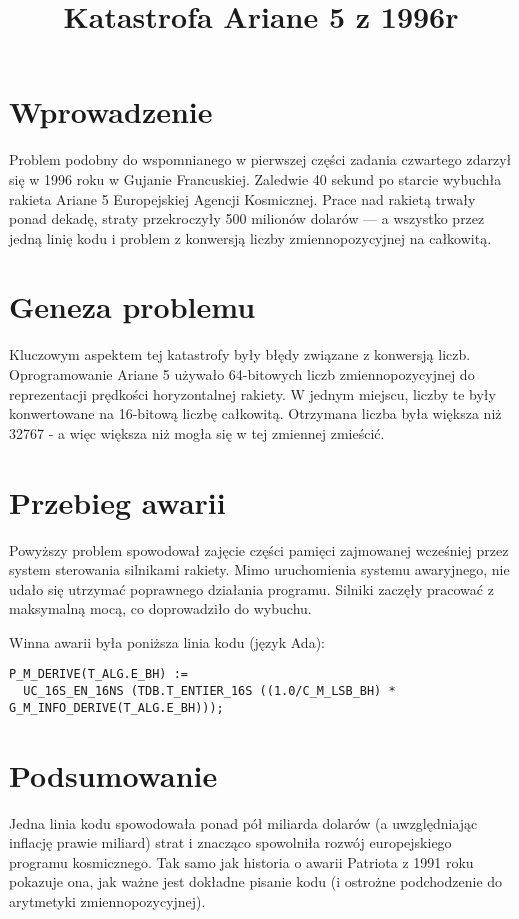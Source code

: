 \documentclass{article}
\begin{document}
\title{Katastrofa Ariane 5 z 1996r}
\author{}
\date{}

\maketitle

\section*{Wprowadzenie}
Problem podobny do wspomnianego w pierwszej części zadania czwartego zdarzył się w 1996 roku w Gujanie Francuskiej. Zaledwie 40 sekund po starcie wybuchła rakieta Ariane 5 Europejskiej Agencji Kosmicznej. Prace nad rakietą trwały ponad dekadę, straty przekroczyły 500 milionów dolarów --- a wszystko przez jedną linię kodu i problem z konwersją liczby zmiennopozycyjnej na całkowitą.


\section*{Geneza problemu}
Kluczowym aspektem tej katastrofy były błędy związane z konwersją liczb. Oprogramowanie Ariane 5 używało 64-bitowych liczb zmiennopozycyjnej do reprezentacji prędkości horyzontalnej rakiety. W jednym miejscu, liczby te były konwertowane na 16-bitową liczbę całkowitą. Otrzymana liczba była większa niż 32767 - a więc większa niż mogła się w tej zmiennej zmieścić.

\section*{Przebieg awarii}
Powyższy problem spowodował zajęcie części pamięci zajmowanej wcześniej przez system sterowania silnikami rakiety. Mimo uruchomienia systemu awaryjnego, nie udało się utrzymać poprawnego działania programu. Silniki zaczęły pracować z maksymalną mocą, co doprowadziło do wybuchu.


Winna awarii była poniższa linia kodu (język Ada):
\begin{verbatim}
P_M_DERIVE(T_ALG.E_BH) := 
  UC_16S_EN_16NS (TDB.T_ENTIER_16S ((1.0/C_M_LSB_BH) * G_M_INFO_DERIVE(T_ALG.E_BH)));
\end{verbatim}

\section*{Podsumowanie}

Jedna linia kodu spowodowała ponad pół miliarda dolarów (a uwzględniając inflację prawie miliard) strat i znacząco spowolniła rozwój europejskiego programu kosmicznego. Tak samo jak historia o awarii Patriota z 1991 roku pokazuje ona, jak ważne jest dokładne pisanie kodu (i ostrożne podchodzenie do arytmetyki zmiennopozycyjnej).
\end{document}
